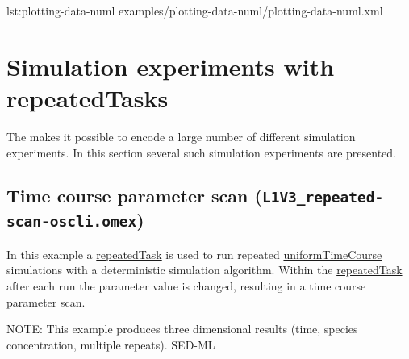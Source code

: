 {lst:plotting-data-numl}
{examples/plotting-data-numl/plotting-data-numl.xml}

\pagebreak
\section{Simulation experiments with repeatedTasks}
The \RepeatedTask makes it possible to encode a large number of different simulation experiments. In this section several such simulation experiments are presented.

\subsection{Time course parameter scan (\texttt{L1V3\_repeated-scan-oscli.omex})}
In this example a \hyperref[class:repeatedTask]{repeatedTask} is used to run repeated \hyperref[class:uniformTimeCourse]{uniformTimeCourse} simulations with a deterministic simulation algorithm. Within the \hyperref[class:repeatedTask]{repeatedTask} after each run the parameter value is changed, resulting in a time course parameter scan.

NOTE: This example produces three dimensional results (time, species concentration, multiple repeats).  SED-ML \currentLV {}

